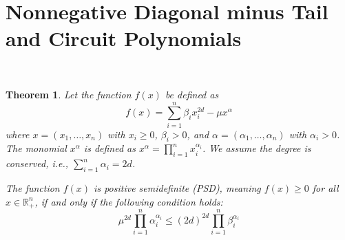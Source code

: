 \documentclass{article}
\newtheorem{theorem}{Theorem}
\begin{document}
\section{Nonnegative Diagonal minus Tail and Circuit Polynomials}\label{s02}
~~
\begin{theorem}
Let the function $f(x)$ be defined as
\[
   f(x) = \sum_{i=1}^n \beta_i x_i^{2d} - \mu x^{\alpha}
\]
where $x = (x_1, \dots, x_n)$ with $x_i \geq 0$, $\beta_i > 0$, and $\alpha = (\alpha_1, \dots, \alpha_n)$ with
$\alpha_i > 0$. The monomial $x^{\alpha}$ is defined as $x^{\alpha} = \prod_{i=1}^n x_i^{\alpha_i}$. We assume the
degree is conserved, i.e., $\sum_{i=1}^n \alpha_i = 2d$.

The function $f(x)$ is positive semidefinite (PSD), meaning $f(x) \geq 0$ for all $x \in \mathbb{R}_+^n$, if and only
if the following condition holds:
\[
   \mu^{2d} \prod_{i=1}^n \alpha_i^{\alpha_i} \leq (2d)^{2d} \prod_{i=1}^n \beta_i^{\alpha_i}
\]
\end{theorem}
\end{document}
